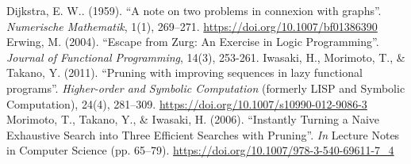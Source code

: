 \documentclass[journal,onecolumn]{IEEEtran}
\begin{document}
\begin{thebibliography}{6}
       Dijkstra, E. W.. (1959). ``A note on two problems in connexion with graphs''. \textit{Numerische Mathematik}, 1(1), 269–271. \url{https://doi.org/10.1007/bf01386390}
       Erwing, M. (2004). ``Escape from Zurg: An Exercise in Logic Programming''. \textit{Journal of Functional Programming}, 14(3), 253-261.
       Iwasaki, H., Morimoto, T., \& Takano, Y. (2011). ``Pruning with improving sequences in lazy functional programs''. \textit{Higher-order and Symbolic Computation} (formerly LISP and Symbolic Computation), 24(4), 281–309. \url{https://doi.org/10.1007/s10990-012-9086-3}
       Morimoto, T., Takano, Y., \& Iwasaki, H. (2006). ``Instantly Turning a Naive Exhaustive Search into Three Efficient Searches with Pruning''. \textit{In} Lecture Notes in Computer Science (pp. 65–79). \url{https://doi.org/10.1007/978-3-540-69611-7_4}

\end{thebibliography}
              
\end{document}

